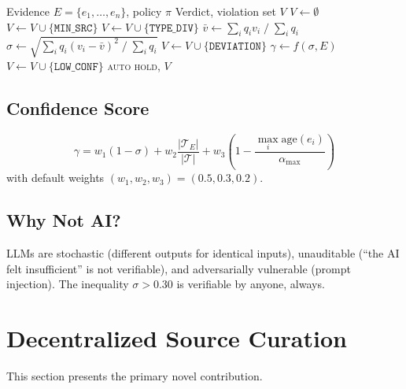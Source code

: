 \documentclass[11pt,a4paper,twocolumn]{article}
\begin{document}
\begin{algorithm}[H]
\caption{Policy Evaluation}
\label{alg:policy}
\footnotesize
\begin{algorithmic}[1]
\Require Evidence $E = \{e_1,\ldots,e_n\}$, policy $\pi$
\Ensure Verdict, violation set $V$
\State $V \gets \emptyset$
    \State $V \gets V \cup \{\texttt{MIN\_SRC}\}$
\EndIf
{}
    \State $V \gets V \cup \{\texttt{TYPE\_DIV}\}$
\EndIf
\State $\bar{v} \gets \sum_i q_i v_i \;/\; \sum_i q_i$
\State $\sigma \gets \sqrt{\sum_i q_i(v_i - \bar{v})^2 \;/\; \sum_i q_i}$
\If{$\sigma > \delta_{\max}$}
    \State $V \gets V \cup \{\texttt{DEVIATION}\}$
\EndIf
\State $\gamma \gets f(\sigma, E)$
\If{$\gamma < \gamma_{\min}$}
    \State $V \gets V \cup \{\texttt{LOW\_CONF}\}$
\EndIf
{}
    \Return \textsc{auto}
\Else{}
    \Return \textsc{hold}, $V$
\EndIf
\end{algorithmic}
\end{algorithm}

\subsection{Confidence Score}

\begin{equation}
    \gamma = w_1(1{-}\sigma) + w_2 \frac{|\mathcal{T}_E|}{|\mathcal{T}|} + w_3 \!\left(1 {-} \frac{\max_i \text{age}(e_i)}{\alpha_{\max}}\right)
    \label{eq:conf}
\end{equation}
with default weights $(w_1,w_2,w_3) = (0.5, 0.3, 0.2)$.

\subsection{Why Not AI?}

LLMs are stochastic (different outputs for identical inputs), unauditable (``the AI felt insufficient'' is not verifiable), and adversarially vulnerable (prompt injection). The inequality $\sigma > 0.30$ is verifiable by anyone, always.

\section{Decentralized Source Curation}

This section presents the primary novel contribution.
\end{document}
